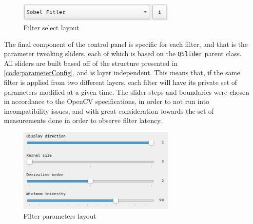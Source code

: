 \begin{figure}[H]
	\includegraphics[width=0.7\textwidth, height=0.1\textwidth]{resources/Buttons_Selector.png}
	\caption{Filter select layout}
\end{figure}

The final component of the control panel is specific for each filter, and that is the parameter tweaking
sliders, each of which is based on the \verb|QSlider| parent class. All sliders are built based off of the
structure presented in \cref{code:parameterConfig}, and is layer independent. This means that, if the same
filter is applied from two different layers, each filter will have its private set of parameters modified
at a given time. The slider steps and boundaries were chosen in accordance to the OpenCV specifications,
in order to not run into incompatibility issues, and with great consideration towards the set of measurements
done in order to observe filter latency.

\begin{figure}[H]
	\includegraphics[width=0.7\textwidth, height=0.5\textwidth]{resources/Buttons_Sliders.png}
	\caption{Filter parameters layout}
\end{figure}

